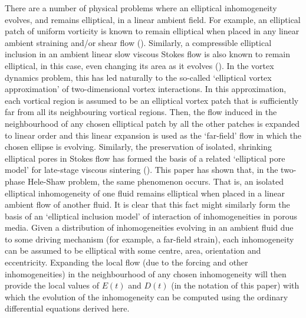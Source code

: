 \documentclass{article}
\begin{document}
There are a number of physical problems where an elliptical inhomogeneity
evolves, and remains elliptical, in a linear ambient field. For example,
an elliptical patch of uniform vorticity is known to remain elliptical when
placed in any linear ambient straining and/or shear flow (\citealt{PGS}).  Similarly,
a compressible elliptical inclusion in an ambient linear slow viscous Stokes
flow is also known to remain elliptical, in this case, even changing its
area as it evolves (\citealt{Cro1}). In the vortex dynamics problem, this has
led naturally to the so-called `elliptical vortex approximation' of two-dimensional
vortex interactions. In this approximation, each vortical region is assumed
to be an elliptical vortex patch that is sufficiently far from all its neighbouring
vortical regions.  Then, the flow induced in the neighbourhood of any chosen
elliptical patch by all the other patches is expanded to linear order and
this linear expansion is used as the `far-field' flow in which the chosen
ellipse is evolving. Similarly, the preservation of isolated, shrinking elliptical
pores in Stokes flow has formed the basis of a related `elliptical pore model'
for late-stage viscous sintering (\citealt{Cro2}). This paper has shown that,
in the two-phase Hele-Shaw problem, the same phenomenon occurs. That is,
an isolated elliptical inhomogeneity of one fluid remains elliptical when
placed in a linear ambient flow of another fluid. It is clear that this fact
might similarly form the basis of an `elliptical inclusion model' of interaction
of inhomogeneities in porous media. Given a distribution of inhomogeneities
evolving in an ambient fluid due to some driving mechanism (for example,
a far-field strain), each inhomogeneity can be assumed to be elliptical with
some centre, area, orientation and eccentricity. Expanding the local flow
(due to the forcing and other inhomogeneities) in the neighbourhood of any
chosen inhomogeneity will then provide the local values of $E(t)$ and $D(t)$
(in the notation of this paper) with which the evolution of the inhomogeneity
can be computed using the ordinary differential equations derived here.
\end{document}
